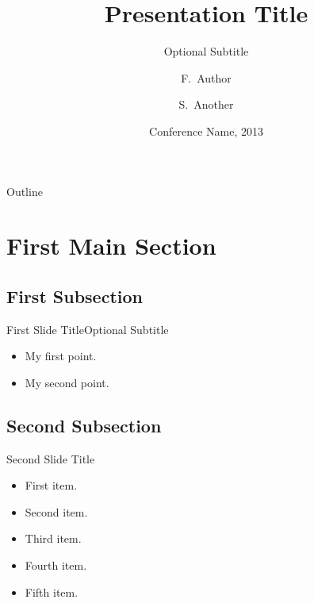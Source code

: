 \documentclass{beamer}
\title{Presentation Title}
\subtitle{Optional Subtitle}
\author{F.~Author\inst{1} \and S.~Another\inst{2}}
\institute[Universities of Somewhere and Elsewhere] %
{
  \inst{1}%
  Department of Computer Science\\
  University of Somewhere
  \and
  \inst{2}%
  Department of Theoretical Philosophy\\
  University of Elsewhere}
\date{Conference Name, 2013}
\begin{document}
\begin{frame}
  \titlepage
\end{frame}

\begin{frame}{Outline}
  \tableofcontents
\end{frame}

\section{First Main Section}

\subsection{First Subsection}

\begin{frame}{First Slide Title}{Optional Subtitle}
  \begin{itemize}
  \item {
    My first point.
  }
  \item {
    My second point.
  }
  \end{itemize}
\end{frame}

\subsection{Second Subsection}

\begin{frame}{Second Slide Title}
  \begin{itemize}
  \item {
    First item.
    \pause %
  }
  \item {   
    Second item.
  }
  \item<3-> {
    Third item.
  }
 \item<4-> {
    Fourth item.
  }
  \item<5-> {
    Fifth item. 
  }
  \end{itemize}
\end{frame}
\end{document}
